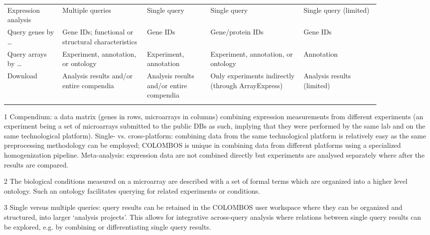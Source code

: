 \begin{sidewaystable}
\begin{threeparttable}
\begin{small}
\begin{tabular}{ >{\raggedright}p{0.13\linewidth} 
	>{\raggedright}p{0.2\linewidth} >{\raggedright}p{0.15\linewidth} 
	>{\raggedright}p{0.22\linewidth} >{\raggedright}p{0.18\linewidth} @{}}
		\arrayrulecolor{Black}
		\multicolumn{5}{l}{\bf Functionalities}
		\tabularnewline
		\hline
		Expression analysis\tnote{3} & Multiple queries & Single query & Single 
		query & Single query (limited) \tabularnewline[1ex] 
		\arrayrulecolor{Gray}\hline
		Query genes by \ldots & Gene IDs; functional or structural 
		characteristics & Gene IDs & Gene/protein IDs & Gene IDs 
		\tabularnewline[1ex] 
		\arrayrulecolor{Gray}\hline	
		Query arrays by \ldots & Experiment, annotation, or ontology & 
		Experiment, annotation & Experiment, annotation, or ontology & 
		Annotation \tabularnewline[1ex] 
		\arrayrulecolor{Gray}\hline
		Download & Analysis results and/or entire compendia & Analysis results 
		and/or entire compendia & Only experiments indirectly (through 
		ArrayExpress) & Analysis results (limited) \tabularnewline
		\arrayrulecolor{Black}\bottomrule 
	\end{tabular}
	\end{small}
	\begin{tiny}
	\begin{tablenotes}
		\item[1] Compendium: a data matrix (genes in rows, microarrays in 
		columns) combining expression measurements from different experiments 
		(an experiment being a set of microarrays submitted to the public DBs 
		as such, implying that they were performed by the same lab and on the 
		same technological platform). Single- vs. cross-platform: combining 
		data from the same technological platform is relatively easy as the 
		same preprocessing methodology can be employed; COLOMBOS is unique in 
		combining data from different platforms using a specialized 
		homogenization pipeline. Meta-analysis: expression data are not 
		combined directly but experiments are analysed separately where after 
		the results are compared.
		\item[2] The biological conditions measured on a microarray are 
		described with a set of formal terms which are organized into a higher 
		level ontology. Such an ontology facilitates querying for related 
		experiments or conditions.
		\item[3] Single versus multiple queries: query results can be retained 
		in the COLOMBOS user workspace where they can be organized and 
		structured, into larger `analysis projects'. This allows for 
		integrative across-query analysis where relations between single query 
		results can be explored, e.g. by combining or differentiating single 
		query results.
	\end{tablenotes}
	\end{tiny}
	\end{threeparttable}
\end{sidewaystable}



